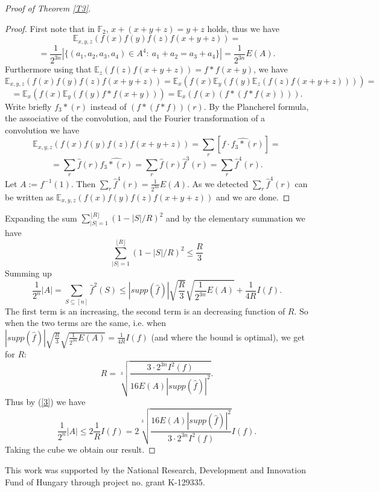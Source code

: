 \documentclass[12pt]{amsart}%
\theoremstyle{definition}
\begin{document}
\begin{proof}[Proof of Theorem \ref{T3}]
\begin{proof}
First note that in $\mathbb{F}_2$, $x+(x+y+z)=y+z$ holds, thus we have
$$
\mathbb{E}_{x,y,z}(f(x)f(y)f(z)f(x+y+z))=
$$
$$
=\frac{1}{2^{3n}}|\{(a_1,a_2,a_3,a_4)\in A^4: \ a_1+a_2=a_3+a_4\}|=\frac{1}{2^{3n}}E(A).
$$
Furthermore using that $\mathbb{E}_z(f(z)f(x+y+z))=f\ast f(x+y)$, we have
$$
\mathbb{E}_{x,y,z}(f(x)f(y)f(z)f(x+y+z))=\mathbb{E}_x(f(x)\mathbb{E}_y(f(y)\mathbb{E}_z(f(z)f(x+y+z))))=
$$
$$
=\mathbb{E}_x(f(x)\mathbb{E}_y(f(y)f\ast f(x+y)))=\mathbb{E}_x(f(x)(f\ast(f\ast f(x)))).
$$
Write briefly $f_3\ast (r)$ instead of $(f\ast (f\ast f))(r)$. By the Plancherel formula, the associative of the convolution, and the Fourier transformation of a convolution we have
$$
\mathbb{E}_{x,y,z}(f(x)f(y)f(z)f(x+y+z))=\sum_r[\widehat{f\cdot f_3\ast (r)}]=
$$
$$
=\sum_r\widehat{f}(r)\widehat{f_3\ast (r)}=\sum_r\widehat{f}(r)\widehat{f}^3(r)=\sum_r\widehat{f}^4(r).
$$
Let $A:=f^{-1}(1)$. Then $\sum_r\widehat{f}^4(r)=\frac{1}{2^{3n}}E(A)$. As we detected $\sum_r\widehat{f}^4(r)$ can be written as $\mathbb{E}_{x,y,z}(f(x)f(y)f(z)f(x+y+z))$ and we are done.

\end{proof}

Expanding the sum $\sum^{\lfloor R\rfloor}_{|S|=1}(1-|S|/R)^2$ and by the elementary summation we have
$$
\sum^{\lfloor R\rfloor}_{|S|=1}(1-|S|/R)^2\leq \frac{R}{3}
$$
Summing up
\begin{equation}\label{3}
\frac{1}{2^n}|A|=\sum_{S\subseteq [n]}\widehat{f}^2(S)\leq |supp(\widehat{f})|\sqrt{\frac{R}{3}}\sqrt{\frac{1}{2^{3n}}E(A)}+\frac{1}{4R} I(f).
\end{equation}
The first term is an increasing, the second term is an decreasing function of $R$. So when the two terms are the same, i.e. when $|supp(\widehat{f})|\sqrt{\frac{R}{3}}\sqrt{\frac{1}{2^{3n}}E(A)}=\frac{1}{4R} I(f)$ (and where the bound is optimal), we get for $R$:
$$
R=\sqrt[3]{\frac{3\cdot{2^{3n}}I^2(f)}{16E(A)|supp(\widehat{f})|^2}}.
$$
Thus by (\ref{3}) we have
$$
\frac{1}{2^n}|A|\leq 2\frac{1}{R}I(f)=2\sqrt[3]{\frac{16E(A)|supp(\widehat{f})|^2}{3\cdot{2^{3n}}I^2(f)}}I(f).
$$
Taking the cube we obtain our result.
\end{proof}


\medskip

 This work was supported by the National Research, Development and Innovation Fund of Hungary through project no. grant K-129335.

\medskip
\end{document}
